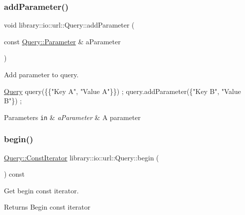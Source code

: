 \subsubsection{\texorpdfstring{add\+Parameter()}{addParameter()}}
{\footnotesize\ttfamily void library\+::io\+::url\+::\+Query\+::add\+Parameter (\begin{DoxyParamCaption}\item[{const \hyperlink{classlibrary_1_1io_1_1url_1_1_query_1_1_parameter}{Query\+::\+Parameter} \&}]{a\+Parameter }\end{DoxyParamCaption})}



Add parameter to query. 


\begin{DoxyCode}
\hyperlink{classlibrary_1_1io_1_1url_1_1_query_a6781de8f7b7251f8e17c191434b08039}{Query} query(\{\{\textcolor{stringliteral}{"Key A"}, \textcolor{stringliteral}{"Value A"}\}\}) ;
query.addParameter(\{\textcolor{stringliteral}{"Key B"}, \textcolor{stringliteral}{"Value B"}\}) ;
\end{DoxyCode}



\begin{DoxyParams}[1]{Parameters}
\mbox{\tt in}  & {\em a\+Parameter} & A parameter \\
\hline
\end{DoxyParams}
\mbox{\label{classlibrary_1_1io_1_1url_1_1_query_a598fb9d455508308210e5cd12bca0d01}} 
\subsubsection{\texorpdfstring{begin()}{begin()}}
{\footnotesize\ttfamily \hyperlink{classlibrary_1_1io_1_1url_1_1_query_a244b3517cf5a3d1abf7e8c8d9d40cf04}{Query\+::\+Const\+Iterator} library\+::io\+::url\+::\+Query\+::begin (\begin{DoxyParamCaption}{ }\end{DoxyParamCaption}) const}



Get begin const iterator. 

\begin{DoxyReturn}{Returns}
Begin const iterator 
\end{DoxyReturn}
\mbox{\label{classlibrary_1_1io_1_1url_1_1_query_ac88e26c91e0d31da540933d0892145d5}} 
